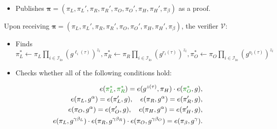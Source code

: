 \documentclass[../../book.tex]{subfiles}
\begin{document}
\begin{tcolorbox}
\begin{itemize}[label=]
\begin{align*}
            \pi_L \gets g^{\textcolor{green!50!black}{\ell_{\text{mid}}(\tau)}}, \quad \pi_L' \gets g^{\alpha \textcolor{green!50!black}{\ell_{\text{mid}}(\tau)}}, \\
            \pi_R \gets g^{\textcolor{green!50!black}{r_{\text{mid}}(\tau)}}, \quad \pi_R' \gets g^{\alpha \textcolor{green!50!black}{r_{\text{mid}}(\tau)}}, \\
            \pi_O \gets g^{\textcolor{green!50!black}{o_{\text{mid}}(\tau)}}, \quad \pi_O' \gets g^{\alpha \textcolor{green!50!black}{o_{\text{mid}}(\tau)}}, \\
            \pi_H \gets g^{h(\tau)}, \quad \pi_H' \gets g^{\alpha h(\tau)}, \\
            \pi_{\beta} \gets g^{\beta_L\ell(\tau) + \beta_Rr(\tau) + \beta_Oo(\tau)}.
        \end{align*}
        \item Publishes $\boldsymbol{\pi} = (\pi_L,\pi_L',\pi_R,\pi_R',\pi_O,\pi_O',\pi_H,\pi_H',\pi_{\beta})$ as a proof.
    \end{itemize}

    \newpage
    Upon receiving $\boldsymbol{\pi} = (\pi_L,\pi_L',\pi_R,\pi_R',\pi_O,\pi_O',\pi_H,\pi_H',\pi_{\beta})$, the verifier $\mathcal{V}$:
    \begin{itemize}[label=]
        \item \textcolor{green!50!black}{Finds $\pi_L^* \gets \pi_L\prod_{i \in \mathcal{I}_{\text{io}}} (g^{\ell_i(\tau)})^{z_i},\pi_R^* \gets \pi_R\prod_{i \in \mathcal{I}_{\text{io}}} (g^{r_i(\tau)})^{z_i},\pi_O^* \gets \pi_O\prod_{i \in \mathcal{I}_{\text{io}}} (g^{o_i(\tau)})^{z_i}$}
        \item Checks whether all of the following conditions hold:
    \end{itemize}
    \begin{align*}
        e(\textcolor{green!50!black}{\pi_L^*}, \textcolor{green!50!black}{\pi_R^*}) = e(g^{z(\tau)}, \pi_H) \cdot e(\textcolor{green!50!black}{\pi_O^*}, g), \\
        e(\pi_L, g^{\alpha}) = e(\pi_L', g), \quad e(\pi_R, g^{\alpha}) = e(\pi_R', g), \\
        e(\pi_O, g^{\alpha}) = e(\pi_O', g), \quad e(\pi_H, g^{\alpha}) = e(\pi_H', g), \\
        e(\pi_L, g^{\gamma\beta_L}) \cdot e(\pi_R, g^{\gamma\beta_R}) \cdot e(\pi_O, g^{\gamma\beta_O}) = e(\pi_{\beta}, g^{\gamma}).
    \end{align*}
\end{tcolorbox}
\end{document}
